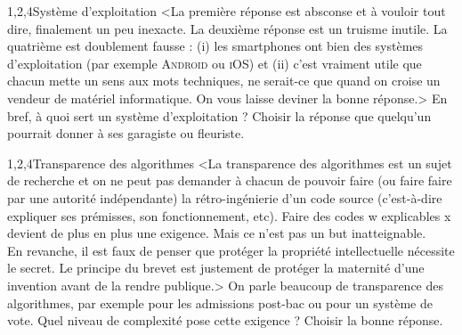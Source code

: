 \begin{quiz}[title={Entrailles et contexte d'un objet numérique}]
\begin{quizquestion*}{3}{1,2,4}{Système d'exploitation}
<La première réponse est absconse et à vouloir tout dire, finalement un peu inexacte. La deuxième réponse est un truisme inutile. La quatrième est doublement fausse : (i) les smartphones ont bien des systèmes d'exploitation (par exemple \textsc{Android} ou \textsc{iOS}) et (ii) c'est vraiment utile que chacun mette un sens aux mots techniques, ne serait-ce que quand on croise un vendeur de matériel informatique. On vous laisse deviner la bonne réponse.>
En bref, à quoi sert un système d'exploitation ?
Choisir la réponse que quelqu'un pourrait donner à ses garagiste ou fleuriste.
\end{quizquestion*}

\begin{quizquestion*}{3}{1,2,4}{Transparence des algorithmes}
<La transparence des algorithmes est un sujet de recherche et on ne peut pas demander à chacun de pouvoir faire (ou faire faire par une autorité indépendante) la rétro-ingénierie d'un code source (c'est-à-dire expliquer ses prémisses, son fonctionnement, etc). Faire des codes w explicables x devient de plus en plus une exigence.
Mais ce n'est pas un but inatteignable.\\
En revanche, il est faux de penser que protéger la propriété intellectuelle nécessite le secret. Le principe du brevet est justement de protéger la maternité d'une invention avant de la rendre publique.>
On parle beaucoup de transparence des algorithmes, par exemple pour les admissions post-bac ou pour un système de vote.
Quel niveau de complexité pose cette exigence ?
Choisir la bonne réponse.
\end{quizquestion*}



\end{quiz}
